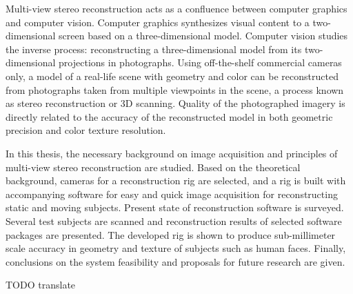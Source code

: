 \begin{abstractpage}[english]
Multi-view stereo reconstruction acts as a confluence between computer graphics and computer vision.
Computer graphics synthesizes visual content to a two-dimensional screen based on a three-dimensional model.
Computer vision studies the inverse process: reconstructing a three-dimensional model from its two-dimensional projections in photographs.
Using off-the-shelf commercial cameras only, a model of a real-life scene with geometry and color can be reconstructed from photographs taken from multiple viewpoints in the scene, a process known as stereo reconstruction or 3D scanning.
Quality of the photographed imagery is directly related to the accuracy of the reconstructed model in both geometric precision and color texture resolution.

In this thesis, the necessary background on image acquisition and principles of multi-view stereo reconstruction are studied.
Based on the theoretical background, cameras for a reconstruction rig are selected, and a rig is built with accompanying software for easy and quick image acquisition for reconstructing static and moving subjects.
Present state of reconstruction software is surveyed.
Several test subjects are scanned and reconstruction results of selected software packages are presented.
The developed rig is shown to produce sub-millimeter scale accuracy in geometry and texture of subjects such as human faces.
Finally, conclusions on the system feasibility and proposals for future research are given.
\end{abstractpage}

\newpage

\keywords{}
\begin{abstractpage}[finnish]
	TODO translate
\end{abstractpage}
